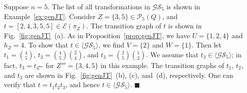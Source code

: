 \documentclass{llncs}
\newcommand{\cE}{{\mathcal E}}
\newcommand{\cG}{{\mathcal G}}
\newcommand{\cP}{{\mathcal P}}
\newcommand{\cS}{{\mathcal S}}
\newcommand{\qedb}{\hfill$\blacksquare$}
\begin{document}
\begin{example}\label{ex:GS}
Suppose $n = 5$. The list of all transformations in $\cG\cS_5$ is shown in Example~\ref{ex:genJT}. 
Consider $Z = \{3,5\} \in \cP_5(Q)$, and $t = [2,4,3,5,5] \in \cE(\pi_Z)$. The transition graph of $t$ is shown in Fig.~\ref{fig:genJT}~(a). As in Proposition~\ref{prop:genJT}, we have $U = \{1,2,4\}$ and $h_Z = 4$. To show that $t \in \langle \cG\cS_5 \rangle$, we find $V = \{2\}$ and $W = \{1\}$. Then let $t_1 = {4 \choose 5}$, $t_2 = {4 \choose 5}{2 \choose 4}$, and $t_3 = {2 \choose 5}{1 \choose 2}$. We assume that $t_3 \in \langle \cG\cS_5 \rangle$; in fact, $t_3 = t_{Z'''}$ for $Z''' = \{3,4,5\}$ in this example. The transition graphs of $t_1$, $t_2$, and $t_3$ are shown in Fig.~\ref{fig:genJT}~(b), (c), and~(d), respectively. One can verify that $t = t_1t_2t_3$, and hence $t \in \langle \cG\cS_5 \rangle$. 
\qedb


\end{example}
\end{document}
